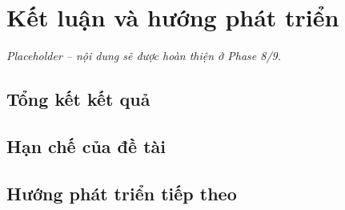 \chapter*{Kết luận và hướng phát triển}

\textit{Placeholder -- nội dung sẽ được hoàn thiện ở Phase 8/9.}

\section*{Tổng kết kết quả}

\section*{Hạn chế của đề tài}

\section*{Hướng phát triển tiếp theo}

